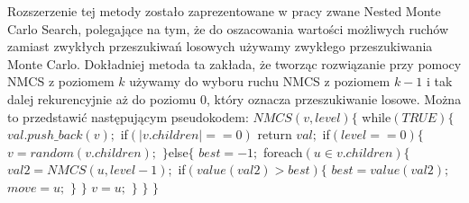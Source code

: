 \documentclass{pracamgr}
\begin{document}
     Rozszerzenie tej metody zostało zaprezentowane w pracy \cite{NMCS} zwane Nested Monte Carlo Search, polegające na tym, że do oszacowania
     wartości możliwych ruchów zamiast zwykłych przeszukiwań losowych używamy zwykłego przeszukiwania Monte Carlo.
     Dokładniej metoda ta zakłada, że tworząc rozwiązanie przy pomocy NMCS z poziomem $k$ używamy do wyboru ruchu NMCS z poziomem $k-1$ i tak dalej rekurencyjnie
     aż do poziomu $0$, który oznacza przeszukiwanie losowe. Można to przedstawić następującym pseudokodem:\newline\newline%
     \hspace*{0pt}$NMCS(v,level)\{$\newline
     \hspace*{16pt}	while$(TRUE)\{$\newline
     \hspace*{32pt}		$val.push\_back(v);$\newline
     \hspace*{32pt}		if$(|v.children|==0)$ return $val;$\newline
     \hspace*{32pt}		if$(level==0)\{$\newline
     \hspace*{48pt}			$v=random(v.children);$\newline
     \hspace*{32pt}		$\}$else$\{$\newline
     \hspace*{48pt}			$best=-1;$\newline    
     \hspace*{48pt}			foreach$(u\in v.children)\{$\newline
     \hspace*{64pt}				$val2=NMCS(u,level-1);$\newline
     \hspace*{64pt}				if$(value(val2)>best)\{$\newline
     \hspace*{80pt}					$best=value(val2);$\newline
     \hspace*{80pt}					$move=u;$\newline
     \hspace*{64pt}				$\}$\newline
     \hspace*{48pt}			$\}$\newline
     \hspace*{48pt}			$v=u;$\newline
     \hspace*{32pt}		$\}$\newline
     \hspace*{16pt}	$\}$\newline
     \hspace*{0pt}$\}$
\end{document}
